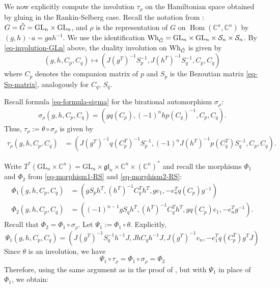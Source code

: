 \documentclass[11pt]{article}
\theoremstyle{definition}
\theoremstyle{plain}
\theoremstyle{remark}
\newcommand{\GL}{\mathrm{GL}}
\newcommand{\numberset}{\mathbb}
\newcommand{\C}{\numberset{C}}
\newcommand{\gl}{\mathfrak{gl}}
\DeclareMathOperator{\Hom}{Hom}
\begin{document}
            We now explicitly compute the involution $\tau_\rho$ on the Hamiltonian space obtained by gluing in the Rankin-Selberg case. Recall the notation from : $G = \Check{G} = \GL_n \times \GL_n$, and $\rho$ is the representation of $G$ on $\Hom(\C^n,\C^n)$ by $(g,h) \cdot a = gah^{-1}$. We use the identification $\mathrm{Wh}_{\Check{G}} = \GL_n \times \GL_n \times \mathcal{S}_n \times \mathcal{S}_n$. By \eqref{eq-involution-GLn} above, the duality involution on $\mathrm{Wh}_{\Check{G}}$ is given by
            \[
                (g,h,C_p,C_q) \mapsto (J(g^T)^{-1}S_p^{-1}, J(h^T)^{-1}S_q^{-1},C_p,C_q)
            \]
            where $C_p$ denotes the companion matrix of $p$ and $S_p$ is the Bezoutian matrix \eqref{eq-Sp-matrix}, analogously for $C_q$, $S_q$.

            Recall formula \eqref{eq-formula-sigma} for the birational automorphism $\sigma_\rho$: 
            \[
                \sigma_{\rho}(g,h,C_p,C_q) = (gq(C_p), (-1)^nhp(C_q)^{-1}, C_p, C_q).
            \]
            Thus, $\tau_\rho := \theta \circ \sigma_\rho$ is given by
            \begin{align*}
                \tau_{\rho}(g,h,C_p,C_q) &= (J(g^T)^{-1}q(C_p^T)^{-1}S_p^{-1}, (-1)^nJ(h^T)^{-1}p(C_q^T)S_q^{-1}, C_p, C_q).
            \end{align*}

            Write $T^*(\GL_n \times \C^n) = \GL_n \times \gl_n \times \C^n \times (\C^n)^*$ and recall the morphisms $\Phi_1$ and $\Phi_2$ from \eqref{eq-morphism1-RS} and \eqref{eq-morphism2-RS}:
            \begin{align*}
                \Phi_1(g,h,C_p,C_q) &= (gS_ph^T,(h^T)^{-1}C_q^Th^T,ge_1,-e_n^Tq(C_p)g^{-1}) \\
                \Phi_2(g,h,C_p,C_q) &= ((-1)^{n-1}gS_q h^T,(h^T)^{-1}C_q^Th^T,gq(C_p)e_1,-e_n^Tg^{-1}). 
            \end{align*}
            Recall that $\Phi_2 = \Phi_1 \circ \sigma_\rho$. Let $\Psi_1 := \Phi_1 \circ \theta$.  Explicitly,
            \begin{equation*}
                \Psi_1(g,h,C_p,C_q) = (J(g^T)^{-1}S_q^{-1}h^{-1}J, JhC_qh^{-1}J, J(g^T)^{-1}e_n, -e_1^Tq(C_p^T)g^TJ)
            \end{equation*}
            Since $\theta$ is an involution, we have 
            \[
                \Psi_1 \circ \tau_{\rho} = \Phi_1 \circ \sigma_{\rho} = \Phi_2
            \]
            Therefore, using the same argument as in the proof of , but with $\Psi_1$ in place of $\Phi_1$, we obtain:
            
\end{document}
